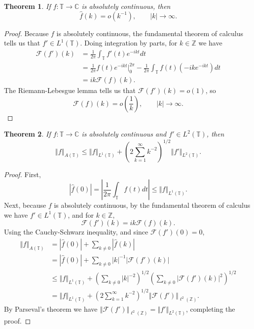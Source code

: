 \documentclass{article}
\newcommand{\norm}[1]{\left\Vert #1 \right\Vert}
\newtheorem{theorem}{Theorem}
\theoremstyle{definition}
\begin{document}
\begin{theorem}
If $f:\mathbb{T} \to \mathbb{C}$ is absolutely continuous, then
\[
\hat{f}(k) = o(k^{-1}), \qquad |k| \to \infty.
\]
\end{theorem}
\begin{proof}
Because $f$ is absolutely continuous, the fundamental theorem of calculus tells us that
$f' \in L^1(\mathbb{T})$.
Doing integration by parts, for  $k \in \mathbb{Z}$ we have
\begin{align*}
\mathscr{F}(f')(k)& = \frac{1}{2\pi} \int_{\mathbb{T}} f'(t) e^{-ikt} dt\\
&=\frac{1}{2\pi} f(t) e^{-ikt} \Big|_0^{2\pi} - \frac{1}{2\pi} \int_{\mathbb{T}} f(t) (-ik e^{-ikt}) dt\\
&=ik \mathscr{F}(f)(k).
\end{align*}
The Riemann-Lebesgue lemma tells us that $\mathscr{F}(f')(k)=o(1)$, so
\[
\mathscr{F}(f)(k) = o\left(\frac{1}{k}\right), \qquad |k| \to \infty.
\]
\end{proof}


\begin{theorem}
If $f:\mathbb{T} \to \mathbb{C}$ is absolutely continuous and $f' \in L^2(\mathbb{T})$,
then
\[
\norm{f}_{A(\mathbb{T})} \leq \norm{f}_{L^1(\mathbb{T})} +
\left(2 \sum_{k=1}^\infty k^{-2} \right)^{1/2} \norm{f'}_{L^2(\mathbb{T})}.
\]
\end{theorem}
\begin{proof}
First,
\[
|\hat{f}(0)| = \left| \frac{1}{2\pi} \int_{\mathbb{T}} f(t) dt \right|
\leq \norm{f}_{L^1(\mathbb{T})}.
\]
Next, because $f$ is absolutely continuous, by the fundamental theorem of calculus we have
$f' \in L^1(\mathbb{T})$, and  for $k \in \mathbb{Z}$,
\[
\mathscr{F}(f')(k)=ik \mathscr{F}(f)(k).
\]
Using the Cauchy-Schwarz inequality, and since $\mathscr{F}(f')(0)=0$,
\begin{align*}
\norm{f}_{A(\mathbb{T})}&=|\hat{f}(0)|+\sum_{k \neq 0} |\hat{f}(k)|\\
&=|\hat{f}(0)|+\sum_{k \neq 0} |k|^{-1} |\mathscr{F}(f')(k)|\\
&\leq \norm{f}_{L^1(\mathbb{T})} + \left( \sum_{k \neq 0} |k|^{-2} \right)^{1/2} \left( \sum_{k \neq 0} |\mathscr{F}(f')(k)|^2 \right)^{1/2}\\
&=  \norm{f}_{L^1(\mathbb{T})} + \left( 2 \sum_{k=1}^\infty k^{-2} \right)^{1/2}
\norm{\mathscr{F}(f')}_{\ell^2(\mathbb{Z})}.
\end{align*}
By Parseval's theorem we have
$\norm{\mathscr{F}(f')}_{\ell^2(\mathbb{Z})}=\norm{f'}_{L^2(\mathbb{T})}$, completing the proof.
\end{proof}
\end{document}
